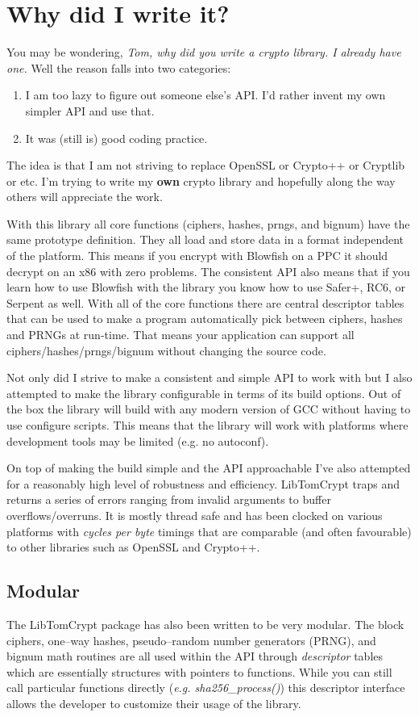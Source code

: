 \documentclass[synpaper]{book}
\newcommand{\mysection}[1]    %
	{                   %
	\section{#1}
   \markboth{\textsf{www.libtom.net}}{\thesection ~ {#1}}
	}
\begin{document}
\mysection{Why did I write it?}
You may be wondering, \textit{Tom, why did you write a crypto library.  I already have one.}  Well the reason falls into
two categories:
\begin{enumerate}
    \item I am too lazy to figure out someone else's API.  I'd rather invent my own simpler API and use that.
    \item It was (still is) good coding practice.
\end{enumerate}

The idea is that I am not striving to replace OpenSSL or Crypto++ or Cryptlib or etc.  I'm trying to write my
{\bf own} crypto library and hopefully along the way others will appreciate the work.

With this library all core functions (ciphers, hashes, prngs, and bignum) have the same prototype definition.  They all load
and store data in a format independent of the platform.  This means if you encrypt with Blowfish on a PPC it should decrypt
on an x86 with zero problems.  The consistent API also means that if you learn how to use Blowfish with the library you
know how to use Safer+, RC6, or Serpent as well.  With all of the core functions there are central descriptor tables
that can be used to make a program automatically pick between ciphers, hashes and PRNGs at run-time.  That means your
application can support all ciphers/hashes/prngs/bignum without changing the source code.

Not only did I strive to make a consistent and simple API to work with but I also attempted to make the library
configurable in terms of its build options.  Out of the box the library will build with any modern version of GCC
without having to use configure scripts.  This means that the library will work with platforms where development
tools may be limited (e.g. no autoconf).

On top of making the build simple and the API approachable I've also attempted for a reasonably high level of
robustness and efficiency.  LibTomCrypt traps and returns a series of errors ranging from invalid
arguments to buffer overflows/overruns.  It is mostly thread safe and has been clocked on various platforms
with \textit{cycles per byte} timings that are comparable (and often favourable) to other libraries such as OpenSSL and
Crypto++.

\subsection{Modular}
The LibTomCrypt package has also been written to be very modular.  The block ciphers, one--way hashes,
pseudo--random number generators (PRNG), and bignum math routines are all used within the API through \textit{descriptor} tables which
are essentially structures with pointers to functions.  While you can still call particular functions
directly (\textit{e.g. sha256\_process()}) this descriptor interface allows the developer to customize their
usage of the library.
\end{document}

